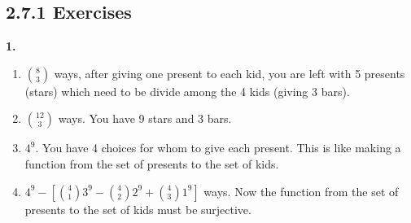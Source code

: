 \documentclass[10pt,]{book}
\theoremstyle{plain}
\theoremstyle{definition}
\theoremstyle{definition}
\theoremstyle{definition}
\numberwithin{equation}{section}
\begin{document}
\subsection*{2.7.1 Exercises}
\noindent\textbf{1.}\quad{}
            \leavevmode%
\begin{enumerate}[label=(\alph*)]
\item\hypertarget{li-663}{}\({8 \choose 3}\) ways, after giving one present to each kid, you are left with 5 presents (stars) which need to be divide among the 4 kids (giving 3 bars).%
\item\hypertarget{li-664}{}\({12 \choose 3}\) ways. You have 9 stars and 3 bars.%
\item\hypertarget{li-665}{}\(4^9\). You have 4 choices for whom to give each present. This is like making a function from the set of presents to the set of kids.%
\item\hypertarget{li-666}{}\(4^9 - \left[{4 \choose 1}3^9 - {4\choose 2}2^9 + {4 \choose 3}1^9 \right]\) ways. Now the function from the set of presents to the set of kids must be surjective.%
\end{enumerate}
\end{document}
